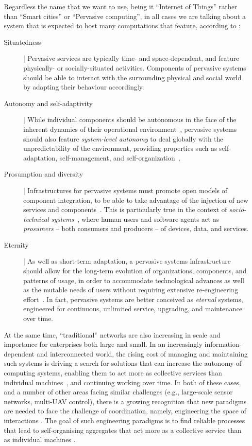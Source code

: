 \documentclass[12pt,a4paper,twoside,openright]{book}
\begin{document}
Regardless the name that we want to use, being it ``Internet of Things'' rather than ``Smart cities'' or ``Pervasive computing'', in all cases we are talking about a system that is expected to host many computations that feature, according to \cite{ker2014}:
\begin{description}
\item[Situatedness] | Pervasive services are typically time- and space-dependent, and feature physically- or socially-situated activities. Components of pervasive systems should be able to interact with the surrounding physical and social world by adapting their behaviour accordingly.
%
\item[Autonomy and self-adaptivity] | While individual components should be autonomous in the face of the inherent dynamics of their operational environment~\cite{agents-ieeecn6}, pervasive systems should also feature \emph{system-level autonomy} to deal globally with the unpredictability of the environment, providing properties such as self-adaptation, self-management, and self-organization~\cite{Mam06}.
%
\item[Prosumption and diversity] | Infrastructures for pervasive systems must promote open models of component integration, to be able to take advantage of the injection of new services and components~\cite{ZamO04}. This is particularly true in the context of \emph{socio-technical systems}~\cite{interactioncomplexity-iccci2013}, where human users and software agents act as \emph{prosumers} -- both consumers and producers -- of devices, data, and services.
%
\item[Eternity] | As well as short-term adaptation, a pervasive systems infrastructure should allow for the long-term evolution of organizations, components, and patterns of usage, in order to accommodate technological advances as well as the mutable needs of users without requiring extensive re-engineering effort~\cite{softwareevolution-iwpse2005}. In fact, pervasive systems are better conceived as \emph{eternal} systems, engineered for continuous, unlimited service, upgrading, and maintenance over time.
\end{description}

At the same time, ``traditional'' networks are also increasing in scale and importance for enterprises both large and small.
%
In an increasingly information-dependent and interconnected world, the rising cost of managing and maintaining such systems is driving a search for solutions that can increase the autonomy of computing systems, enabling them to act more as collective services than individual machines~\cite{eze2012autonomic, hu2011cloudreview}, and continuing working over time.
%
In both of these cases, and a number of other areas facing similar challenges (e.g., large-scale sensor networks, multi-UAV control), there is a growing recognition that new paradigms are needed to face the challenge of coordination, namely, engineering the space of interactions \cite{Wegner}.
%
The goal of such engineering paradigms is to find reliable processes that lead to self-organising aggregates that act more as a collective service than as individual machines \cite{Cabri03,Bis11,Social12,PSC13}.
\end{document}
